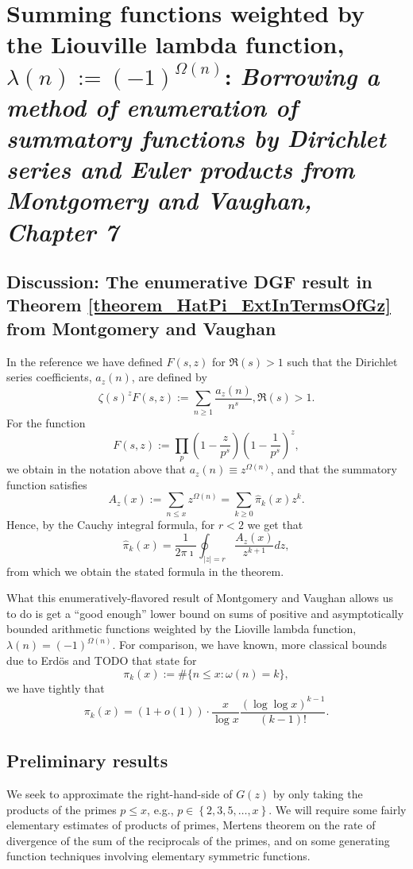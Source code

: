 \documentclass[11pt,reqno,a4letter]{article}
\numberwithin{figure}{section}
\numberwithin{table}{section}
\theoremstyle{plain}
\numberwithin{theorem}{section}
\theoremstyle{definition}
\begin{document}
\newpage 
\section{Summing functions weighted by the Liouville lambda function, $\lambda(n) := (-1)^{\Omega(n)}$: 
         \textit{
         Borrowing a method of enumeration of summatory functions by Dirichlet series and Euler products 
         from Montgomery and Vaughan, Chapter 7} 
        } 
\label{Section_MVCh7_GzBounds} 
        
\subsection{Discussion: The enumerative DGF result in Theorem \ref{theorem_HatPi_ExtInTermsOfGz} from 
            Montgomery and Vaughan} 

In the reference we have defined $F(s, z)$ for $\Re(s) > 1$ such that the 
Dirichlet series coefficients, $a_z(n)$, are defined by 
\[
\zeta(s)^z F(s, z) := \sum_{n \geq 1} \frac{a_z(n)}{n^s}, \Re(s) > 1. 
\]
For the function 
\[
F(s, z) := \prod_p \left(1 - \frac{z}{p^s}\right) \left(1-\frac{1}{p^s}\right)^z, 
\]
we obtain in the notation above that $a_z(n) \equiv z^{\Omega(n)}$, and that the summatory 
function satisfies 
\[
A_z(x) := \sum_{n \leq x} z^{\Omega(n)} = \sum_{k \geq 0} \widehat{\pi}_k(x) z^k. 
\]
Hence, by the Cauchy integral formula, for $r < 2$ we get that 
\[
\widehat{\pi}_k(x) = \frac{1}{2\pi\imath} \oint_{|z|=r} \frac{A_z(x)}{z^{k+1}} dz, 
\]
from which we obtain the stated formula in the theorem. 

What this enumeratively-flavored result of Montgomery and Vaughan allows us to do is get a 
``good enough'' lower bound on sums of positive and asymptotically bounded arithmetic functions 
weighted by the Lioville lambda function, $\lambda(n) = (-1)^{\Omega(n)}$. 
For comparison, we have known, more classical bounds due to Erd\"os and TODO that state for 
\[
\pi_k(x) := \#\{n \leq x: \omega(n) = k\}, 
\]
we have tightly that \cite{TODO,TODO} 
\[
\pi_k(x) = (1 + o(1)) \cdot \frac{x}{\log x} \frac{(\log\log x)^{k-1}}{(k-1)!}. 
\] 

\subsection{Preliminary results} 

We seek to approximate the right-hand-side of $G(z)$ by only taking the products of the primes 
$p \leq x$, e.g., $p \in \left\{2,3,5,\ldots,x\right\}$. 
We will require some fairly elementary estimates of products of primes, Mertens theorem on the 
rate of divergence of the sum of the reciprocals of the primes, and on some generating function 
techniques involving elementary symmetric functions. 
\end{document}

